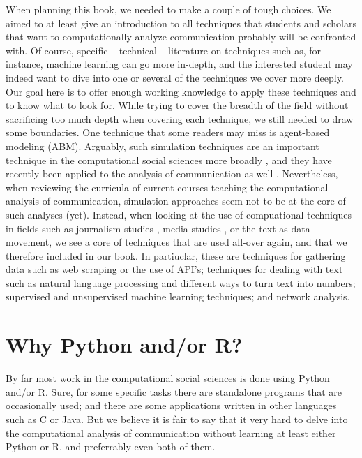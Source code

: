 When planning this book, we needed to make a couple of tough
choices. We aimed to at least give an introduction to all techniques
that students and scholars that want to computationally analyze
communication probably will be confronted with. Of course, specific --
technical -- literature on techniques such as, for instance, machine
learning can go more in-depth, and the interested student may indeed
want to dive into one or several of the techniques we cover more
deeply. Our goal here is to offer enough working knowledge to apply
these techniques and to know what to look for.  While trying to cover
the breadth of the field without sacrificing too much depth when
covering each technique, we still needed to draw some boundaries. One
technique that some readers may miss is agent-based modeling
(ABM). Arguably, such simulation techniques are an important technique
in the computational social sciences more broadly
\citep{cioffi-revilla2014}, and they have recently been applied to the
analysis of communication as well
\citep{Waldherr2014,Wettstein2020}. Nevertheless, when reviewing the
curricula of current courses teaching the computational analysis of
communication, simulation approaches seem not to be at the core of
such analyses (yet).  Instead, when looking at the use of compuational
techniques in fields such as journalism studies
\citep[e.g.,][]{Boumans2016}, media studies , or
the text-as-data movement, we see a core of
techniques that are used all-over again, and that we therefore
included in our book. In partiuclar, these are techniques for
gathering data such as web scraping or the use of API's; techniques
for dealing with text such as natural language processing and
different ways to turn text into numbers; supervised and unsupervised
machine learning techniques; and network analysis.



\section{Why Python and/or R?}
By far most work in the computational social sciences is done using
Python and/or R. Sure, for some specific tasks there are standalone
programs that are occasionally used; and there are some applications
written in other languages such as C or Java. But we believe it is
fair to say that it very hard to delve into the computational analysis
of communication without learning at least either Python or R, and
preferrably even both of them.

